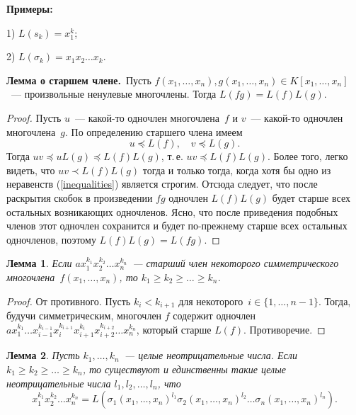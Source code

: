 \documentclass[a4paper,10pt]{amsart}
\newtheorem{lemma}{Лемма}
\theoremstyle{definition}
\theoremstyle{remark}
\begin{document}
\textbf{Примеры:}

1) $L(s_k) = x_1^k$;

2) $L(\sigma_k) = x_1x_2 \ldots x_k$.


{\bf Лемма о старшем члене.}\, Пусть $f(x_1, \ldots, x_n), g(x_1,
\ldots, x_n) \in K[x_1, \ldots, x_n]$~--- произвольные ненулевые
многочлены. Тогда $L(f g ) = L(f) L(g)$.

\begin{proof}
	Пусть $u$~--- какой-то одночлен многочлена~$f$ и $v$~--- какой-то
	одночлен многочлена~$g$. По определению старшего члена имеем
	\begin{equation} \label{inequalities}
		u \preccurlyeq L(f), \quad v \preccurlyeq L(g).
	\end{equation}
	Тогда $uv \preccurlyeq uL(g) \preccurlyeq L(f)L(g)$, т.\,е. $uv
	\preccurlyeq L(f) L(g)$. Более того, легко видеть, что $uv \prec
	L(f) L(g)$ тогда и только тогда, когда хотя бы одно из
	\guillemotleft неравенств\guillemotright{} (\ref{inequalities})
	является строгим. Отсюда следует, что после раскрытия скобок в
	произведении $fg$ одночлен $L(f)L(g)$ будет старше всех остальных
	возникающих одночленов. Ясно, что после приведения подобных членов
	этот одночлен сохранится и будет по-прежнему старше всех остальных
	одночленов, поэтому $L(f)L(g) = L(fg)$.
\end{proof}

\begin{lemma} \label{lemma_1}
	Если $ax_1^{k_1}x_2^{k_2}\ldots x_n^{k_n}$~--- старший член
	некоторого симметрического многочлена~$f(x_1, \ldots, x_n)$, то $k_1
	\geqslant k_2 \geqslant \ldots \geqslant k_n$.
\end{lemma}

\begin{proof}
	От противного. Пусть $k_i < k_{i+1}$ для некоторого~$i \in \lbrace
	1, \ldots, n-1 \rbrace$. Тогда, будучи симметрическим, многочлен $f$
	содержит одночлен $ax_1^{k_1} \ldots
	x_{i-1}^{k_{i-1}}x_i^{k_{i+1}}x_{i+1}^{k_i}x_{i+2}^{k_{i+2}} \ldots
	x_n^{k_n}$, который старше $L(f)$. Противоречие.
\end{proof}

\begin{lemma} \label{lemma_2}
	Пусть $k_1, \ldots, k_n$~--- целые неотрицательные числа. Если $k_1
	\geqslant k_2 \geqslant \ldots \geqslant k_n$, то существуют и
	единственны такие целые неотрицательные числа $l_1, l_2, \ldots,
	l_n$, что
	$$
	x_1^{k_1}x_2^{k_2}\ldots x_n^{k_n}=
	L(\sigma_1(x_1,\ldots,x_n)^{l_1}\sigma_2(x_1,\ldots,x_n)^{l_2}\ldots\sigma_n(x_1,\ldots,x_n)^{l_n}).
	$$
\end{lemma}
\end{document}
